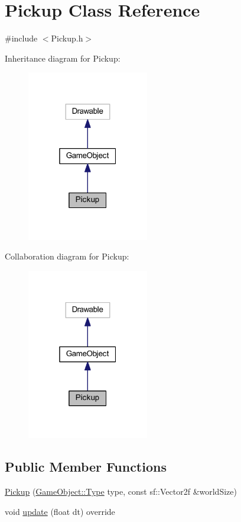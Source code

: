 \hypertarget{class_pickup}{}\section{Pickup Class Reference}
\label{class_pickup}


{\ttfamily \#include $<$Pickup.\+h$>$}



Inheritance diagram for Pickup\+:\nopagebreak
\begin{figure}[H]
\begin{center}
\leavevmode
\includegraphics[width=151pt]{class_pickup__inherit__graph}
\end{center}
\end{figure}


Collaboration diagram for Pickup\+:\nopagebreak
\begin{figure}[H]
\begin{center}
\leavevmode
\includegraphics[width=151pt]{class_pickup__coll__graph}
\end{center}
\end{figure}
\subsection*{Public Member Functions}
\begin{DoxyCompactItemize}
\item 
\hyperlink{class_pickup_ab3ad1a30e2b84f25d66c397403128e0e}{Pickup} (\hyperlink{class_game_object_a4bf9e8f660e6a49f1b802c2aa9dd95af}{Game\+Object\+::\+Type} type, const sf\+::\+Vector2f \&world\+Size)
\item 
void \hyperlink{class_pickup_a009910dfc9488746b3944cfcdd5be7e9}{update} (float dt) override
\end{DoxyCompactItemize}

